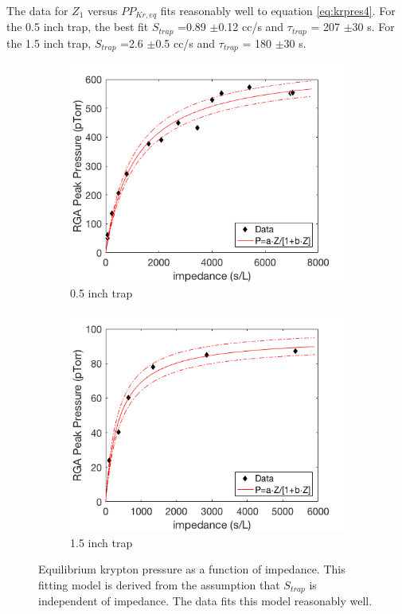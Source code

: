 The data for $Z_1$ versus $PP_{Kr,eq}$ fits reasonably well to equation \ref{eq:krpres4}. For the 0.5 inch trap, the best fit $S_{trap}$ =0.89 $\pm$0.12 cc/s and $\tau_{trap}$ = 207 $\pm$30 s. For the 1.5 inch trap, $S_{trap}$ =2.6 $\pm$0.5 cc/s and $\tau_{trap}$ = 180 $\pm$30 s.
\begin{figure}[h!]
\centering
\begin{subfigure}{0.5\textwidth}
  \centering
  \includegraphics[width=\textwidth]{Figures/SLAC_imp_response.png}
  \caption{0.5 inch trap}
\end{subfigure}%
\begin{subfigure}{0.5\textwidth}
  \centering
  \includegraphics[width=\textwidth]{Figures/SLAC_imp_response_1p5in.png}
  \caption{1.5 inch trap}
\end{subfigure}
\caption{Equilibrium krypton pressure as a function of impedance. This fitting model is derived from the assumption that $S_{trap}$ is independent of impedance. The data fits this model reasonably well.} 
\label{fig:impresponse}
\end{figure}

